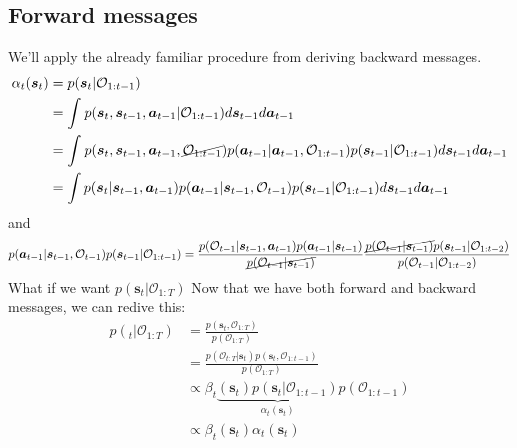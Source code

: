 \documentclass{report}
\begin{document}
\subsection{Forward messages}
We'll apply the already familiar procedure from deriving backward messages.
\begin{align}
\alpha_{ t } (\bm{s}_{t}) &= p (\bm{s}_{t}| \mathcal{O}_{ 1:t-1 }) \\
&= \int_{}^{} p (\bm{s}_{t}, \bm{s}_{t-1}, \bm{a}_{t-1}| \mathcal{O}_{ 1:t-1 }) d\bm{s}_{t-1} d\bm{a}_{t-1} \\
&= \int_{}^{} p (\bm{s}_{t}, \bm{s}_{t-1}, \bm{a}_{t-1}, \cancel{ \mathcal{O}_{ 1:t-1 }}) 
p(\bm{a}_{t-1}| \bm{a}_{t-1}, \mathcal{O}_{ 1:t-1 }) p (\bm{s}_{t-1}| \mathcal{O}_{ 1:t-1 })
d\bm{s}_{t-1} d\bm{a}_{t-1} \\
&= \int p (\bm{s}_{t}| \bm{s}_{t-1}, \bm{a}_{t-1}) p (\bm{a}_{t-1}| \bm{s}_{t-1}, \mathcal{O}_{ t-1 })
p (\bm{s}_{t-1}| \mathcal{O}_{ 1:t-1 })
d\bm{s}_{t-1} d\bm{a}_{t-1} \\
\end{align}
and
\begin{equation}
p (\bm{a}_{t-1}| \bm{s}_{t-1}, \mathcal{O}_{ t-1 })p (\bm{s}_{t-1}| \mathcal{O}_{ 1:t-1 }) =
\frac{p (\mathcal{O}_{ t-1 }|\bm{s}_{t-1}, \bm{a}_{t-1})p (\bm{a}_{t-1}| \bm{s}_{t-1} )}{\cancel{p (\mathcal{O}_{ t-1 }|\bm{s}_{t-1})}} 
\frac{\cancel{p (\mathcal{O}_{ t-1 }| \bm{s}_{t-1})} p (\bm{s}_{t-1}| \mathcal{O}_{ 1:t-2 })}{p (\mathcal{O}_{ t-1 }| \mathcal{O}_{ 1:t-2 })} 
\end{equation}
What if we want $ p (\bm{s}_{t}| \mathcal{O}_{ 1:T })  $
Now that we have both forward and backward messages, we can redive this:
\begin{align}
p (\bm{}_{t}| \mathcal{O}_{ 1:T }) &=
\frac{p (\bm{s}_{t}, \mathcal{O}_{ 1:T })}{p (\mathcal{O}_{ 1:T })} \\
&= \frac{p (\mathcal{O}_{ t:T }|\bm{s}_{t}) p (\bm{s}_{t}, \mathcal{O}_{ 1:t-1 })}{p (\mathcal{O}_{ 1:T })} \\
&\propto \beta_{ t } 
\underbrace{(\bm{s}_{t}) p (\bm{s}_{t}| \mathcal{O}_{ 1:t-1 }) }_{ \alpha_{ t } (\bm{s}_{t}) }
p (\mathcal{O}_{ 1:t-1 }) \\
&\propto \beta_{ t } (\bm{s}_{t}) \alpha_{ t } (\bm{s}_{t})
\end{align}
\end{document}
